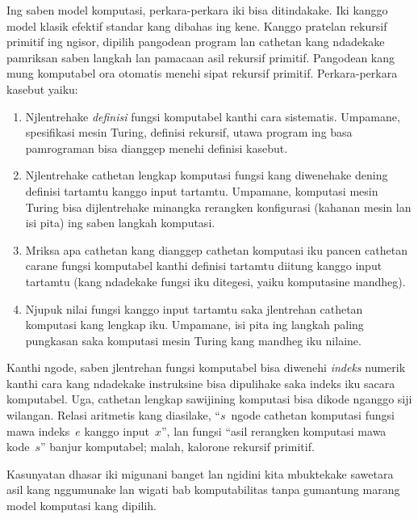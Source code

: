 \documentclass[../../../include/open-logic-section]{subfiles}
\begin{document}

Ing saben model komputasi, perkara-perkara iki bisa ditindakake. Iki kanggo model klasik efektif standar kang dibahas ing kene. Kanggo pratelan rekursif primitif ing ngisor, dipilih pangodean program lan cathetan kang ndadekake pamriksan saben langkah lan pamacaan asil rekursif primitif. Pangodean kang mung komputabel ora otomatis menehi sipat rekursif primitif.
Perkara-perkara kasebut yaiku:
\begin{enumerate}
\item Njlentrehake \emph{definisi} fungsi komputabel
  kanthi cara sistematis. Umpamane, spesifikasi mesin
  Turing, definisi rekursif, utawa program ing basa
  pamrograman bisa dianggep menehi definisi kasebut.
\item Njlentrehake cathetan lengkap komputasi fungsi
  kang diwenehake dening definisi tartamtu kanggo
  input tartamtu. Umpamane, komputasi mesin Turing
  bisa dijlentrehake minangka rerangken konfigurasi
  (kahanan mesin lan isi pita) ing saben langkah komputasi.
\item Mriksa apa cathetan kang dianggep cathetan
  komputasi iku pancen cathetan carane fungsi komputabel
  kanthi definisi tartamtu diitung kanggo input tartamtu
  (kang ndadekake fungsi iku ditegesi, yaiku komputasine
  mandheg).
\item Njupuk nilai fungsi kanggo input tartamtu saka
  jlentrehan cathetan komputasi kang lengkap iku.
  Umpamane, isi pita ing langkah paling pungkasan
  saka komputasi mesin Turing kang mandheg iku nilaine.
\end{enumerate}

Kanthi ngode, saben jlentrehan fungsi komputabel bisa
diwenehi \emph{indeks} numerik kanthi cara kang
ndadekake instruksine bisa dipulihake saka indeks
iku sacara komputabel. Uga, cathetan lengkap sawijining
komputasi bisa dikode nganggo siji wilangan. Relasi
aritmetis kang diasilake, ``$s$~ngode cathetan komputasi
fungsi mawa indeks~$e$ kanggo input~$x$'', lan fungsi
``asil rerangken komputasi mawa kode~$s$'' banjur
komputabel; malah, kalorone rekursif primitif.

Kasunyatan dhasar iki migunani banget lan ngidini
kita mbuktekake sawetara asil kang nggumunake lan
wigati bab komputabilitas tanpa gumantung marang
model komputasi kang dipilih.
\end{document}
